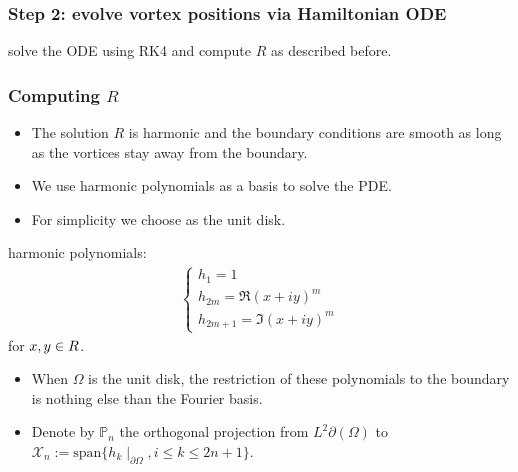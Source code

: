 \documentclass[12pt, a4paper]{article}
\theoremstyle{plain}
\theoremstyle{definition}
\newcommand{\R}{\mathbb{R}}
\begin{document}
\subsubsection{Step 2: evolve vortex positions via Hamiltonian ODE}

solve the ODE using RK4
and compute $R$ as described before.
\\
\subsubsection{Computing $R$}
\begin{itemize}
    \item The solution $R$ is harmonic and the boundary conditions are smooth as long as the vortices stay away from the boundary.
    \item We use harmonic polynomials as a basis to solve the PDE.
    \item For simplicity we choose as the unit disk.
\end{itemize}
harmonic polynomials:
\begin{align}
    \begin{cases}
        h_1 = 1 \\
        h_{2m} = \Re (x+ i y)^m \\
        h_{2m + 1} =  \Im (x+ iy)^m
    \end{cases}
\end{align}
for $x,y \in \mathbb \R$.

\begin{itemize}
    \item When $\Omega$ is the unit disk, the restriction of these polynomials to the boundary is nothing else than the Fourier basis.
    \item Denote by $\mathbb{P}_n$ the orthogonal projection from $L^2 \partial(\Omega)$ to $\mathcal X_n := \text{span}\{h_k \mid_{\partial\Omega}, i \leq k \leq 2n+1\}$.
\end{itemize}
\end{document}
